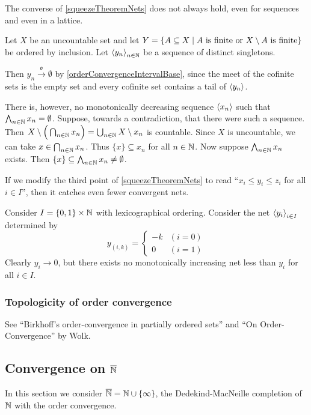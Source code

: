 \begin{example}
The converse of \ref{squeezeTheoremNets} does not always hold, even for sequences and even in a lattice.

Let $X$ be an uncountable set and let $Y = \setbuilder{A\subseteq X}{\text{$A$ is finite or $X\setminus A$ is finite}}$ be ordered by inclusion. Let $\left\langle y_n \right\rangle_{n\in\mathbb{N}}$ be a sequence of distinct singletons.

Then $y_n \overset{\mathfrak{o}}{\longrightarrow} \emptyset$ by \ref{orderConvergenceIntervalBase}, since the meet of the cofinite sets is the empty set and every cofinite set contains a tail of $\left\langle y_n \right\rangle$.

There is, however, no monotonically decreasing sequence $\left\langle x_n \right\rangle$ such that $\bigwedge_{n\in\mathbb{N}}x_n = \emptyset$. Suppose, towards a contradiction, that there were such a sequence. Then $X\setminus \Big(\bigcap_{n\in \mathbb{N}}x_n\Big) = \bigcup_{n\in \mathbb{N}}X\setminus x_n$ is countable. Since $X$ is uncountable, we can take $x\in \bigcap_{n\in \mathbb{N}}x_n$. Thus $\{x\}\subseteq x_n$ for all $n\in \mathbb{N}$. Now suppose $\bigwedge_{n\in \mathbb{N}}x_n$ exists. Then $\{x\}\subseteq \bigwedge_{n\in \mathbb{N}}x_n \neq \emptyset$.
\end{example}

\begin{example}
If we modify the third point of \ref{squeezeTheoremNets} to read ``$x_i \leq y_i \leq z_i$ for all $i\in I$'', then it catches even fewer convergent nets.

Consider $I = \{0,1\}\times\mathbb{N}$ with lexicographical ordering. Consider the net $\left\langle y_i \right\rangle_{i\in I}$ determined by
\[ y_{(i,k)} = \begin{cases}
-k & (i=0) \\
0 & (i=1)
\end{cases} \]
Clearly $y_i \to 0$, but there exists no monotonically increasing net less than $y_i$ for all $i\in I$.
\end{example}

\subsubsection{Topologicity of order convergence}
See ``Birkhoff's order-convergence in partially ordered sets'' and ``On Order-Convergence'' by Wolk.



\subsection{Convergence on $\overline{\mathbb{N}}$}
In this section we consider $\overline{\mathbb{N}} = \mathbb{N} \cup \{\infty\}$, the Dedekind-MacNeille completion of $\mathbb{N}$ with the order convergence.

